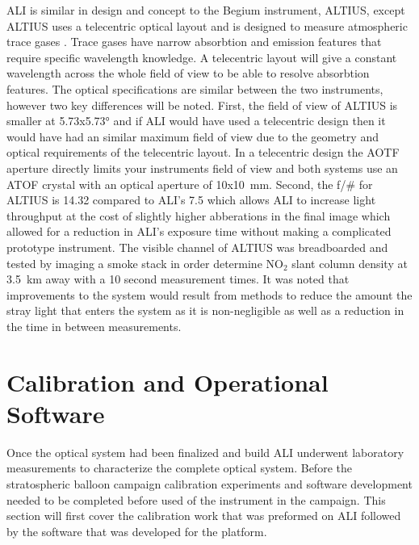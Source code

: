 \documentclass[12pt]{article}
\begin{document}
ALI is similar in design and concept to the Begium instrument, ALTIUS, except ALTIUS uses a telecentric optical layout and is designed to measure atmospheric trace gases \citep{Dekemper2012}. Trace gases have narrow absorbtion and emission features that require specific wavelength knowledge. A telecentric layout will give a constant wavelength across the whole field of view to be able to resolve absorbtion features. The optical specifications are similar between the two instruments, however two key differences will be noted. First, the field of view of ALTIUS is smaller at 5.73x5.73\si{\degree} and if ALI would have used a telecentric design then it would have had an similar maximum field of view due to the geometry and optical requirements of the telecentric layout. In a telecentric design the AOTF aperture directly limits your instruments field of view and both systems use an ATOF crystal with an optical aperture of 10x10~mm. Second, the f/\# for ALTIUS is 14.32 compared to ALI's 7.5 which allows ALI to increase light throughput at the cost of slightly higher abberations in the final image which allowed for a reduction in ALI's exposure time without making a complicated prototype instrument. The visible channel of ALTIUS was breadboarded and tested by imaging a smoke stack in order determine NO$_{2}$ slant column density at 3.5~km away with a 10 second measurement times. It was noted that improvements to the system would result from methods to reduce the amount the stray light that enters the system as it is non-negligible as well as a reduction in the time in between measurements.

\section{Calibration and Operational Software}

Once the optical system had been finalized and build ALI underwent laboratory measurements to characterize the complete optical system. Before the stratospheric balloon campaign calibration experiments and software development needed to be completed before used of the instrument in the campaign. This section will first cover the calibration work that was preformed on ALI followed by the software that was developed for the platform.  
\end{document}
